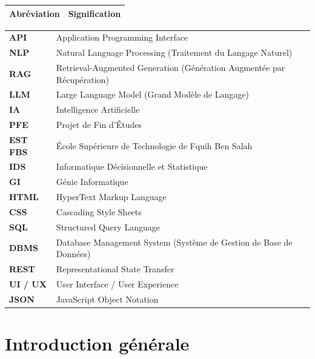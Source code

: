\documentclass[12pt, a4paper, twoside]{report}
\begin{document}
\begin{longtable}{ll}
\toprule
\rowcolor{primary}\textbf{\color{white}Abréviation} & \textbf{\color{white}Signification} \\ 
\midrule
\end{longtable}
\vspace{-1.5cm}
\begin{tabularx}{\textwidth}{>{\bfseries\color{primary}}l X}
\rowcolor{lightgray} API & Application Programming Interface \\
\rowcolor{white} NLP & Natural Language Processing (Traitement du Langage Naturel) \\
\rowcolor{lightgray} RAG & Retrieval-Augmented Generation (Génération Augmentée par Récupération) \\
\rowcolor{white} LLM & Large Language Model (Grand Modèle de Langage) \\
\rowcolor{lightgray} IA & Intelligence Artificielle \\
\rowcolor{white} PFE & Projet de Fin d'Études \\
\rowcolor{lightgray} EST FBS & École Supérieure de Technologie de Fquih Ben Salah \\
\rowcolor{white} IDS & Informatique Décisionnelle et Statistique \\
\rowcolor{lightgray} GI & Génie Informatique \\
\rowcolor{white} HTML & HyperText Markup Language \\
\rowcolor{lightgray} CSS & Cascading Style Sheets \\
\rowcolor{white} SQL & Structured Query Language \\
\rowcolor{lightgray} DBMS & Database Management System (Système de Gestion de Base de Données) \\
\rowcolor{white} REST & Representational State Transfer \\
\rowcolor{lightgray} UI / UX & User Interface / User Experience \\
\rowcolor{white} JSON & JavaScript Object Notation \\
\bottomrule

\end{tabularx}


\newpage

\listoffigures
\newpage

\listoftables
\newpage

\tableofcontents
\newpage


\chapter{Introduction générale}
\end{document}
